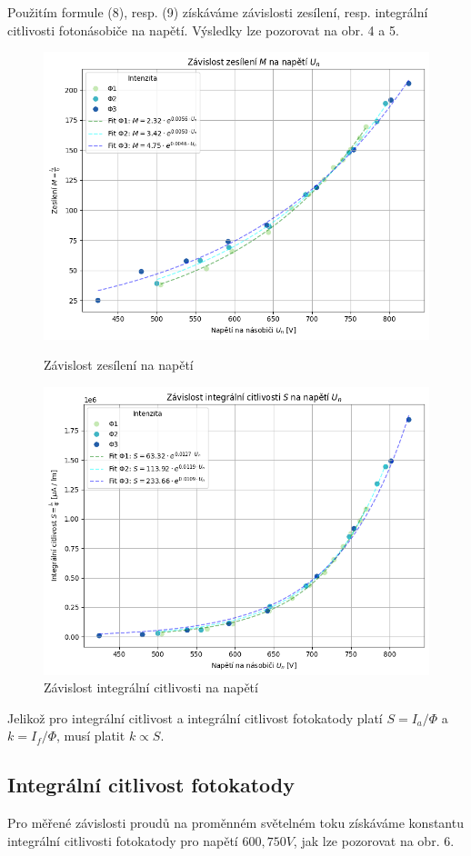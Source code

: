 \documentclass[czech,11pt,a4paper]{article}
\begin{document}
\begin{multicols}{2}
\begin{figure}[H]
		\end{figure}
		Použitím formule (8), resp. (9) získáváme závislosti zesílení, resp. integrální citlivosti fotonásobiče na napětí. Výsledky lze pozorovat na obr. 4 a 5.
		\begin{figure}[H]
			\centering
			\includegraphics[width=0.9\linewidth]{fig2}
			\caption{Závislost zesílení na napětí}
			\includegraphics[width=0.9\linewidth]{fig3}
			\caption{Závislost integrální citlivosti na napětí}
			
		\end{figure}
		Jelikož pro integrální citlivost a integrální citlivost fotokatody platí $S = I_a / \Phi$ a $k = I_f / \Phi$, musí platit $k \propto S$.
		\subsection{Integrální citlivost fotokatody}
		Pro měřené závislosti proudů na proměnném světelném toku získáváme konstantu integrální citlivosti fotokatody pro napětí $600, 750V$, jak lze pozorovat na obr. 6.
		

\end{multicols}
\end{document}
